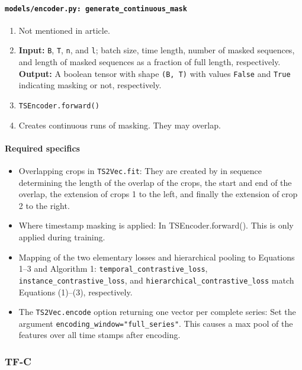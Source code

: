 \documentclass[a4paper,11pt]{article}
\newcommand{\code}[1]{\texttt{#1}}
\begin{document}
\paragraph{\code{models/encoder.py: generate\_continuous\_mask}}
\begin{enumerate}[label=(\roman*)]
\item Not mentioned in article.
\item 
    \textbf{Input:} \texttt{B}, \texttt{T}, \texttt{n}, and \texttt{l}; batch size, time length, number of masked sequences, and length of masked sequences as a fraction of full length, respectively.\\
    \textbf{Output:} A boolean tensor with shape \texttt{(B, T)} with values \texttt{False} and \texttt{True} indicating masking or not, respectively.
\item \texttt{TSEncoder.forward()}
\item Creates continuous runs of masking. They may overlap.
\end{enumerate}

\paragraph{Required specifics}
\begin{itemize}
    \item Overlapping crops in \code{TS2Vec.fit}: They are created by in sequence determining the length of the overlap of the crops, the start and end of the overlap, the extension of crops 1 to the left, and finally the extension of crop 2 to the right.
    \item Where timestamp masking is applied: In TSEncoder.forward(). This is only applied during training.
    \item Mapping of the two elementary losses and hierarchical pooling to Equations 1--3 and Algorithm 1: \texttt{temporal\_contrastive\_loss}, \texttt{instance\_contrastive\_loss}, and \texttt{hierarchical\_contrastive\_loss} match Equations (1)--(3), respectively.
    \item The \code{TS2Vec.encode} option returning one vector per complete series: Set the argument \texttt{encoding\_window="full\_series"}. This causes a max pool of the features over all time stamps after encoding.
\end{itemize}

\subsubsection{TF-C}
\end{document}
